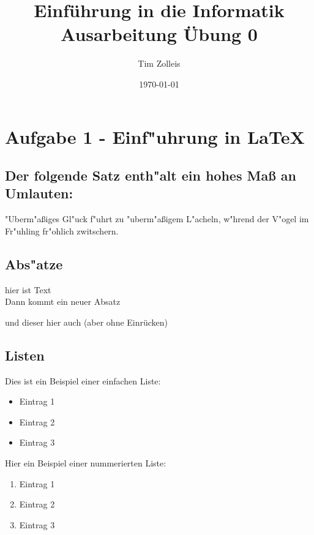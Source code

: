 \documentclass[a4paper,11pt,titlepage]{article}
\begin{document}
    \title{Einf\"uhrung in die Informatik\\
    Ausarbeitung \"Ubung 0}


    \author{Tim Zolleis}


    \date{\today}

    \maketitle{\thispagestyle{plain}}


    \section{Aufgabe 1 - Einf"uhrung in \LaTeX}

    \subsection{Der folgende Satz enth"alt ein hohes Maß an Umlauten:}

    "Uberm"aßiges Gl"uck f"uhrt zu "uberm"aßigem L"acheln, w"hrend der V"ogel im Fr"uhling fr"ohlich zwitschern.

    \subsection{Abs"atze}
    hier ist Text \\

    Dann kommt ein neuer Absatz\newline

    \noindent und dieser hier auch (aber ohne Einr\"ucken)

    \subsection{Listen}

    Dies ist ein Beispiel einer einfachen Liste:
    \begin{itemize}
        \item Eintrag 1
        \item Eintrag 2
        \item Eintrag 3
    \end{itemize}

    \noindent Hier ein Beispiel einer nummerierten Liste:
    \begin{enumerate}
        \item Eintrag 1
        \item Eintrag 2
        \item Eintrag 3
    \end{enumerate}
\end{document}
